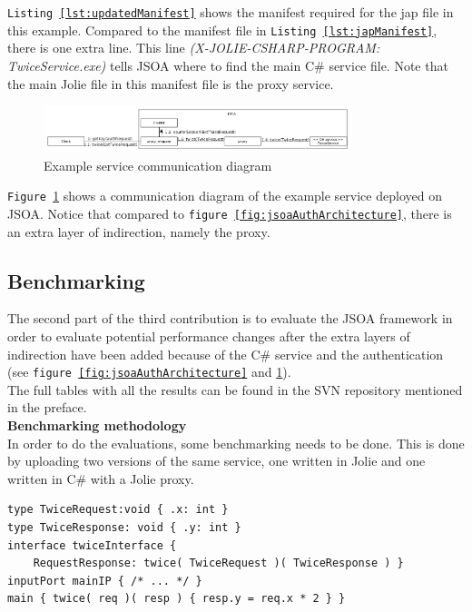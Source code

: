 \documentclass[12pt,a4paper]{article}
\begin{document}
\texttt{Listing \ref{lst:updatedManifest}} shows the manifest required for the jap file in this example. Compared to the manifest file in \texttt{Listing \ref{lst:japManifest}}, there is one extra line. This line \emph{(X-JOLIE-CSHARP-PROGRAM: TwiceService.exe)} tells JSOA where to find the main C\# service file. Note that the main Jolie file in this manifest file is the proxy service.

\begin{figure}[h!]
  \centering
    \includegraphics[width=0.8\textwidth]{../figures/example_service_communication_diagram.png}
  \caption{Example service communication diagram}
  \label{fig:exampleServiceCommunicationDiagram}
\end{figure}

\texttt{Figure \ref{fig:exampleServiceCommunicationDiagram}} shows a communication diagram of the example service deployed on JSOA. Notice that compared to \texttt{figure \ref{fig:jsoaAuthArchitecture}}, there is an extra layer of indirection, namely the proxy. 


\subsection{Benchmarking}\label{subsec:Benchmarking}
The second part of the third contribution is to evaluate the JSOA framework in order to evaluate potential performance changes after the extra layers of indirection have been added because of the C\# service and the authentication (see \texttt{figure \ref{fig:jsoaAuthArchitecture}} and \texttt{\ref{fig:exampleServiceCommunicationDiagram}}). \\
The full tables with all the results can be found in the SVN repository mentioned in the preface.\\

\textbf{Benchmarking methodology}\\
In order to do the evaluations, some benchmarking needs to be done. This is done by uploading two versions of the same service, one written in Jolie and one written in C\# with a Jolie proxy.

\begin{lstlisting}[caption={Jolie implementation of the TwiceService},label={lst:jolieTwice}]
type TwiceRequest:void { .x: int }
type TwiceResponse: void { .y: int }
interface twiceInterface { 
	RequestResponse: twice( TwiceRequest )( TwiceResponse ) }
inputPort mainIP { /* ... */ }
main { twice( req )( resp ) { resp.y = req.x * 2 } }
\end{lstlisting}
\end{document}
